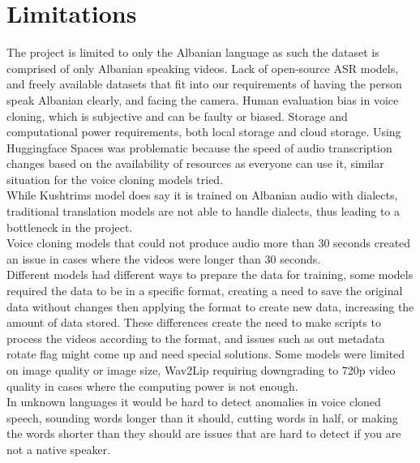 \documentclass[12pt]{article}
\begin{document}
\section{Limitations}
The project is limited to only the Albanian language as such the dataset is comprised of only Albanian speaking videos. Lack of open-source ASR models, and freely available datasets that fit into our requirements of having the person speak Albanian clearly, and facing the camera. Human evaluation bias in voice cloning, which is subjective and can be faulty or biased. Storage and computational power requirements, both local storage and cloud storage. Using Huggingface Spaces was problematic because the speed of audio transcription changes based on the availability of resources as everyone can use it, similar situation for the voice cloning models tried.\\
While Kushtrims model does say it is trained on Albanian audio with dialects, traditional translation models are not able to handle dialects, thus leading to a bottleneck in the project.\\
Voice cloning models that could not produce audio more than 30 seconds created an issue in cases where the videos were longer than 30 seconds.\\
Different models had different ways to prepare the data for training, some models required the data to be in a specific format, creating a need to save the original data without changes then applying the format to create new data, increasing the amount of data stored. These differences create the need to make scripts to process the videos according to the format, and issues such as out metadata rotate flag might come up and need special solutions. Some models were limited on image quality or image size, Wav2Lip requiring downgrading to 720p video quality in cases where the computing power is not enough.\\
In unknown languages it would be hard to detect anomalies in voice cloned speech, sounding words longer than it should, cutting words in half, or making the words shorter than they should are issues that are hard to detect if you are not a native speaker. 
\end{document}
